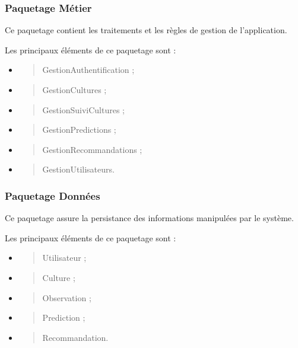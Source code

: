 \hypertarget{paquetage-muxe9tier}{%
\subsubsection{Paquetage Métier}\label{paquetage-muxe9tier}}

Ce paquetage contient les traitements et les règles de gestion de
l'application.

Les principaux éléments de ce paquetage sont :

\begin{itemize}
\item
  \begin{quote}
  GestionAuthentification ;
  \end{quote}
\item
  \begin{quote}
  GestionCultures ;
  \end{quote}
\item
  \begin{quote}
  GestionSuiviCultures ;
  \end{quote}
\item
  \begin{quote}
  GestionPredictions ;
  \end{quote}
\item
  \begin{quote}
  GestionRecommandations ;
  \end{quote}
\item
  \begin{quote}
  GestionUtilisateurs.
  \end{quote}
\end{itemize}

\hypertarget{paquetage-donnuxe9es}{%
\subsubsection{Paquetage Données}\label{paquetage-donnuxe9es}}

Ce paquetage assure la persistance des informations manipulées par le
système.

Les principaux éléments de ce paquetage sont :

\begin{itemize}
\item
  \begin{quote}
  Utilisateur ;
  \end{quote}
\item
  \begin{quote}
  Culture ;
  \end{quote}
\item
  \begin{quote}
  Observation ;
  \end{quote}
\item
  \begin{quote}
  Prediction ;
  \end{quote}
\item
  \begin{quote}
  Recommandation.
  \end{quote}
\end{itemize}

